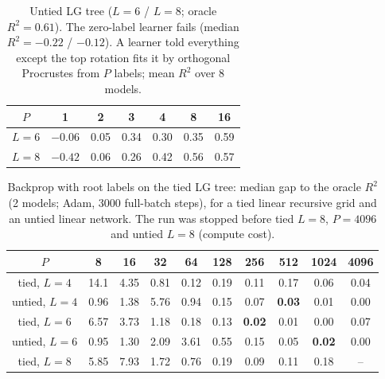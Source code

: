 \documentclass[11pt]{article}
\theoremstyle{definition}
\begin{document}
\begin{table}[h]\centering
\caption{Untied LG tree ($L=6$ / $L=8$; oracle $R^2=0.61$). The zero-label learner fails
(median $R^2=-0.22$ / $-0.12$). A learner told everything except the top rotation fits it by
orthogonal Procrustes from $P$ labels; mean $R^2$ over 8 models.}\label{tab:lguntied}
\small\begin{tabular}{c|cccccc}\toprule
$P$ & 1 & 2 & 3 & 4 & 8 & 16\\ \midrule
$L=6$ & $-0.06$ & 0.05 & 0.34 & 0.30 & 0.35 & 0.59\\
$L=8$ & $-0.42$ & 0.06 & 0.26 & 0.42 & 0.56 & 0.57\\
\bottomrule\end{tabular}
\end{table}

\begin{table}[h]\centering
\caption{Backprop with root labels on the tied LG tree: median gap to the oracle $R^2$ (2 models;
Adam, 3000 full-batch steps), for a tied linear recursive grid and an untied linear network.
The run was stopped before tied $L=8$, $P=4096$ and untied $L=8$ (compute cost).}\label{tab:lgbp}
\small\begin{tabular}{c|ccccccccc}\toprule
$P$ & 8 & 16 & 32 & 64 & 128 & 256 & 512 & 1024 & 4096\\ \midrule
tied, $L=4$ & 14.1 & 4.35 & 0.81 & 0.12 & 0.19 & 0.11 & 0.17 & 0.06 & 0.04\\
untied, $L=4$ & 0.96 & 1.38 & 5.76 & 0.94 & 0.15 & 0.07 & \textbf{0.03} & 0.01 & 0.00\\
tied, $L=6$ & 6.57 & 3.73 & 1.18 & 0.18 & 0.13 & \textbf{0.02} & 0.01 & 0.00 & 0.07\\
untied, $L=6$ & 0.95 & 1.30 & 2.09 & 3.61 & 0.55 & 0.15 & 0.05 & \textbf{0.02} & 0.00\\
tied, $L=8$ & 5.85 & 7.93 & 1.72 & 0.76 & 0.19 & 0.09 & 0.11 & 0.18 & --\\
\bottomrule\end{tabular}
\end{table}
\end{document}
